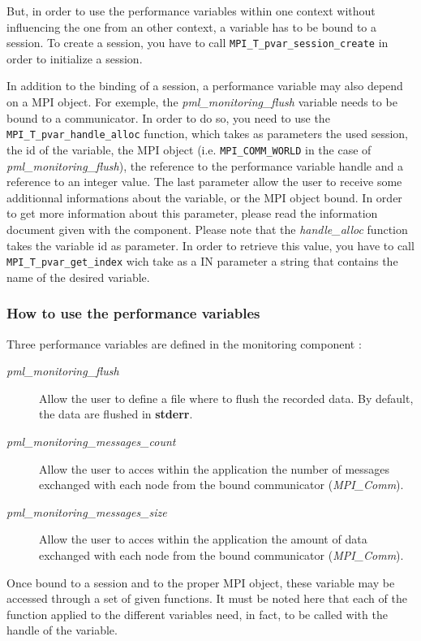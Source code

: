 \documentclass[notitlepage]{article}
\begin{document}
But, in order to use the performance variables within one context
without influencing the one from an other context, a variable has to
be bound to a session. To create a session, you have to call
\texttt{MPI\_T\_pvar\_session\_create} in order to initialize a session.

In addition to the binding of a session, a performance variable may
also depend on a MPI object. For exemple, the
\textit{pml\_monitoring\_flush} variable needs to be bound to a
communicator. In order to do so, you need to use the
\texttt{MPI\_T\_pvar\_handle\_alloc} function, which takes as
parameters the used session, the id of the variable, the MPI object
(i.e. \texttt{MPI\_COMM\_WORLD} in the case of
\textit{pml\_monitoring\_flush}), the reference to the performance
variable handle and a reference to an integer value. The last
parameter allow the user to receive some additionnal informations
about the variable, or the MPI object bound. In order to get more
information about this parameter, please read the information document
given with the component. Please note that the \textit{handle\_alloc}
function takes the variable id as parameter. In order to retrieve this
value, you have to call \texttt{MPI\_T\_pvar\_get\_index} wich take as
a IN parameter a string that contains the name of the desired
variable.

\subsubsection{How to use the performance variables}

Three performance variables are defined in the monitoring component :
\begin{description}
\item [\textit{pml\_monitoring\_flush}] Allow the user to define a file
  where to flush the recorded data. By default, the data are flushed
  in \textbf{stderr}.
\item [\textit{pml\_monitoring\_messages\_count}] Allow the user to acces
  within the application the number of messages exchanged with each
  node from the bound communicator (\textit{MPI\_Comm}).
\item [\textit{pml\_monitoring\_messages\_size}] Allow the user to acces
  within the application the amount of data exchanged with each node
  from the bound communicator (\textit{MPI\_Comm}).
\end{description}

Once bound to a session and to the proper MPI object, these variable
may be accessed through a set of given functions. It must be noted
here that each of the function applied to the different variables
need, in fact, to be called with the handle of the variable.
\end{document}
